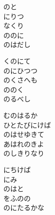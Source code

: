 \documentclass[10pt,b5j]{tarticle} %
\begin{document}
\vspace{1.5em} %
\newcommand{\linespace}{0.5em} %
\newcommand{\blocksize}{0.5\hsize} %
\begin{enumerate} %
    \begin{minipage}[c]{\blocksize}
    
        \vspace{\linespace}
        \item
        のと\\
        にりつ\\
        なくり\\
        ののに\\
        のはだし
        
        \vspace{\linespace}
        \item
        くのにて\\
        のにひつつ\\
        のくさへも\\
        ののく\\
        のるべし
        
        \vspace{\linespace}
        \item
        むのはるか\\
        ひとたびにけば\\
        のはせゆきて\\
        あはれのきよ\\
        のしきりなり
        
        \vspace{\linespace}
        \item
        にちけば\\
        にみ\\
        のはと\\
        をふのの\\
        のにたるかな
        

\end{minipage}
\end{enumerate}
\end{document}
